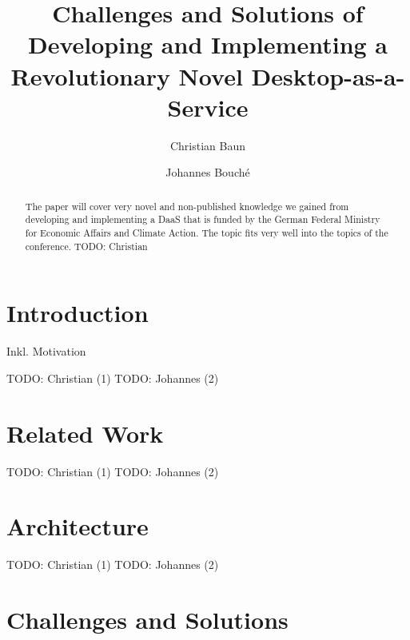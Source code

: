 \documentclass[runningheads]{llncs}
\begin{document}
%
\title{Challenges and Solutions of Developing and
	Implementing a Revolutionary Novel Desktop-as-a-Service}
%
%
\author{Christian Baun \and
	Johannes Bouché}
%
%
%
\maketitle              %
%
\begin{abstract}
	The paper will cover very novel and non-published knowledge we gained
	from developing and implementing a DaaS that is funded by the German
	Federal Ministry for Economic Affairs and Climate Action. The topic
	fits very well into the topics of the conference. TODO: Christian

\end{abstract}
%
%
%
\section{Introduction}

Inkl. Motivation

TODO: Christian (1)
TODO: Johannes (2)

\section{Related Work}
TODO: Christian (1)
TODO: Johannes (2)

\section{Architecture}

TODO: Christian (1)
TODO: Johannes (2)

\section{Challenges and Solutions}
\end{document}

